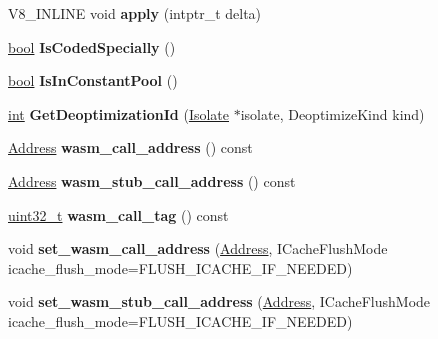 \begin{DoxyCompactItemize}
V8\+\_\+\+I\+N\+L\+I\+NE void {\bfseries apply} (intptr\+\_\+t delta)
\item 
\mbox{\label{classv8_1_1internal_1_1RelocInfo_a8f33d5c22a0e3cbe30e5ff67843dea3f}} 
\mbox{\hyperlink{classbool}{bool}} {\bfseries Is\+Coded\+Specially} ()
\item 
\mbox{\label{classv8_1_1internal_1_1RelocInfo_a74178a98b5efdd971a4f647281b6296e}} 
\mbox{\hyperlink{classbool}{bool}} {\bfseries Is\+In\+Constant\+Pool} ()
\item 
\mbox{\label{classv8_1_1internal_1_1RelocInfo_a25414185c0fd7454a18ab16a64517903}} 
\mbox{\hyperlink{classint}{int}} {\bfseries Get\+Deoptimization\+Id} (\mbox{\hyperlink{classv8_1_1internal_1_1Isolate}{Isolate}} $\ast$isolate, Deoptimize\+Kind kind)
\item 
\mbox{\label{classv8_1_1internal_1_1RelocInfo_ac23f06483254bd0fe0f937d206535830}} 
\mbox{\hyperlink{classuintptr__t}{Address}} {\bfseries wasm\+\_\+call\+\_\+address} () const
\item 
\mbox{\label{classv8_1_1internal_1_1RelocInfo_afec7cdcceb9634b507298486b121f8f4}} 
\mbox{\hyperlink{classuintptr__t}{Address}} {\bfseries wasm\+\_\+stub\+\_\+call\+\_\+address} () const
\item 
\mbox{\label{classv8_1_1internal_1_1RelocInfo_a4532875f67c1658431b317da15aaa1b9}} 
\mbox{\hyperlink{classuint32__t}{uint32\+\_\+t}} {\bfseries wasm\+\_\+call\+\_\+tag} () const
\item 
\mbox{\label{classv8_1_1internal_1_1RelocInfo_a548ba1a0b722b622f2b382887887592a}} 
void {\bfseries set\+\_\+wasm\+\_\+call\+\_\+address} (\mbox{\hyperlink{classuintptr__t}{Address}}, I\+Cache\+Flush\+Mode icache\+\_\+flush\+\_\+mode=F\+L\+U\+S\+H\+\_\+\+I\+C\+A\+C\+H\+E\+\_\+\+I\+F\+\_\+\+N\+E\+E\+D\+ED)
\item 
\mbox{\label{classv8_1_1internal_1_1RelocInfo_a6fcd9eedbac8fa24408e58dd0e9a651e}} 
void {\bfseries set\+\_\+wasm\+\_\+stub\+\_\+call\+\_\+address} (\mbox{\hyperlink{classuintptr__t}{Address}}, I\+Cache\+Flush\+Mode icache\+\_\+flush\+\_\+mode=F\+L\+U\+S\+H\+\_\+\+I\+C\+A\+C\+H\+E\+\_\+\+I\+F\+\_\+\+N\+E\+E\+D\+ED)

\end{DoxyCompactItemize}
